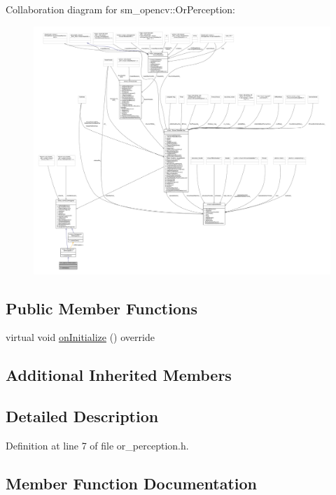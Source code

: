 Collaboration diagram for sm\+\_\+opencv\+:\+:Or\+Perception\+:
\nopagebreak
\begin{figure}[H]
\begin{center}
\leavevmode
\includegraphics[width=350pt]{classsm__opencv_1_1OrPerception__coll__graph}
\end{center}
\end{figure}
\subsection*{Public Member Functions}
\begin{DoxyCompactItemize}
\item 
virtual void \hyperlink{classsm__opencv_1_1OrPerception_a6f2cd09bbd6852b6283a0dff80c8803e}{on\+Initialize} () override
\end{DoxyCompactItemize}
\subsection*{Additional Inherited Members}


\subsection{Detailed Description}


Definition at line 7 of file or\+\_\+perception.\+h.



\subsection{Member Function Documentation}
